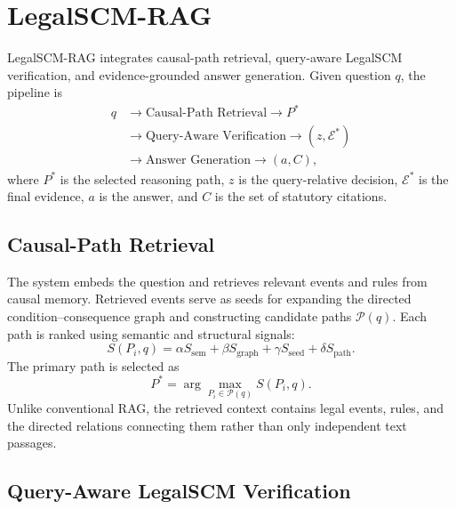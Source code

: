 \section{LegalSCM-RAG}
\label{sec:legalscm_rag}

LegalSCM-RAG integrates causal-path retrieval, query-aware LegalSCM
verification, and evidence-grounded answer generation. Given question $q$, the
pipeline is
\begin{equation}
\begin{aligned}
q
&\rightarrow
\text{Causal-Path Retrieval}
\rightarrow P^*\\
&\rightarrow
\text{Query-Aware Verification}
\rightarrow (z,\mathcal{E}^*)\\
&\rightarrow
\text{Answer Generation}
\rightarrow (a,C),
\end{aligned}
\label{eq:overall_pipeline}
\end{equation}
where $P^*$ is the selected reasoning path, $z$ is the query-relative decision,
$\mathcal{E}^*$ is the final evidence, $a$ is the answer, and $C$ is the set of
statutory citations.

\subsection{Causal-Path Retrieval}

The system embeds the question and retrieves relevant events and rules from
causal memory. Retrieved events serve as seeds for expanding the directed
condition--consequence graph and constructing candidate paths
$\mathcal{P}(q)$. Each path is ranked using semantic and structural signals:
\begin{equation}
S(P_i,q)=
\alpha S_{\mathrm{sem}}
+\beta S_{\mathrm{graph}}
+\gamma S_{\mathrm{seed}}
+\delta S_{\mathrm{path}}.
\end{equation}
The primary path is selected as
\begin{equation}
P^*=\arg\max_{P_i\in\mathcal{P}(q)}S(P_i,q).
\end{equation}
Unlike conventional RAG, the retrieved context contains legal events, rules,
and the directed relations connecting them rather than only independent text
passages.

\subsection{Query-Aware LegalSCM Verification}

